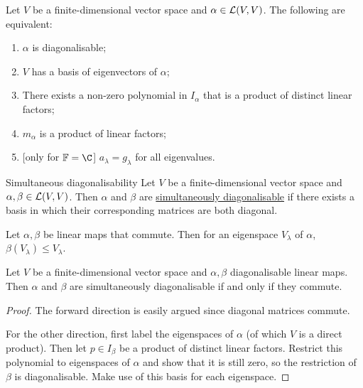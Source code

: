 \documentclass[../Main.tex]{subfiles}
\begin{document}
\begin{theorem}
    Let $V$ be a finite-dimensional vector space and $\alpha \in \mathcal{L}(V, V)$. The following are equivalent:
    \begin{enumerate}
        \item $\alpha$ is diagonalisable;
        \item $V$ has a basis of eigenvectors of $\alpha$;
        \item There exists a non-zero polynomial in $I_\alpha$ that is a product of distinct linear factors;
        \item $m_\alpha$ is a product of linear factors;
        \item {[only for $\F = \C$]} $a_\lambda = g_\lambda$ for all eigenvalues.
    \end{enumerate}
    \label{thmDiagability}
\end{theorem}
\begin{definition}{Simultaneous diagonalisability}
    Let $V$ be a finite-dimensional vector space and $\alpha, \beta \in \mathcal{L}(V, V)$. Then $\alpha$ and $\beta$ are \underline{simultaneously diagonalisable} if there exists a basis in which their corresponding matrices are both diagonal.
\end{definition}
\begin{lemma}
    Let $\alpha, \beta$ be linear maps that commute. Then for an eigenspace $V_\lambda$ of $\alpha$, $\beta(V_\lambda) \leq V_\lambda$.
    \label{lemCommutePreserveESpace}
\end{lemma}
\begin{theorem}
    Let $V$ be a finite-dimensional vector space and $\alpha, \beta$ diagonalisable linear maps. Then $\alpha$ and $\beta$ are simultaneously diagonalisable if and only if they commute.
    \label{thmSimDiagIffCommute}
\end{theorem}
\begin{proof}
    The forward direction is easily argued since diagonal matrices commute.

    For the other direction, first label the eigenspaces of $\alpha$ (of which $V$ is a direct product). Then let $p \in I_\beta$ be a product of distinct linear factors. Restrict this polynomial to eigenspaces of $\alpha$ and show that it is still zero, so the restriction of $\beta$ is diagonalisable. Make use of this basis for each eigenspace.
\end{proof}
\end{document}
